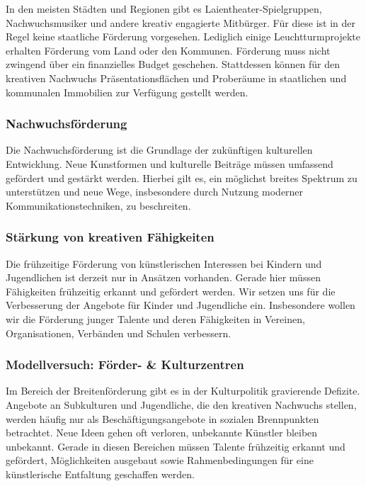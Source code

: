 In den meisten Städten und Regionen gibt es Laientheater-Spielgruppen, Nachwuchsmusiker und andere kreativ engagierte Mitbürger. Für diese ist in der Regel keine staatliche Förderung vorgesehen. Lediglich einige Leuchtturmprojekte erhalten Förderung vom Land oder den Kommunen. Förderung muss nicht zwingend über ein finanzielles Budget geschehen. Stattdessen können für den kreativen Nachwuchs Präsentationsflächen und Proberäume in staatlichen und kommunalen Immobilien zur Verfügung gestellt werden.

\subsubsection{Nachwuchsförderung}

Die Nachwuchsförderung ist die Grundlage der zukünftigen kulturellen Entwicklung. Neue Kunstformen und kulturelle Beiträge müssen umfassend gefördert und gestärkt werden. Hierbei gilt es, ein möglichst breites Spektrum zu unterstützen und neue Wege, insbesondere durch Nutzung moderner Kommunikationstechniken, zu beschreiten.

\subsubsection{Stärkung von kreativen Fähigkeiten}

Die frühzeitige Förderung von künstlerischen Interessen bei Kindern und Jugendlichen ist derzeit nur in Ansätzen vorhanden. Gerade hier müssen Fähigkeiten frühzeitig erkannt und gefördert werden. Wir setzen uns für die Verbesserung der Angebote für Kinder und Jugendliche ein. Insbesondere wollen wir die Förderung junger Talente und deren Fähigkeiten in Vereinen, Organisationen, Verbänden und Schulen verbessern.

\subsubsection{Modellversuch: Förder- \& Kulturzentren}

Im Bereich der Breitenförderung gibt es in der Kulturpolitik gravierende Defizite. Angebote an Subkulturen und Jugendliche, die den kreativen Nachwuchs stellen, werden häufig nur als Beschäftigungsangebote in sozialen Brennpunkten betrachtet. Neue Ideen gehen oft verloren, unbekannte Künstler bleiben unbekannt. Gerade in diesen Bereichen müssen Talente frühzeitig erkannt und gefördert, Möglichkeiten ausgebaut sowie Rahmenbedingungen für eine künstlerische Entfaltung geschaffen werden.


